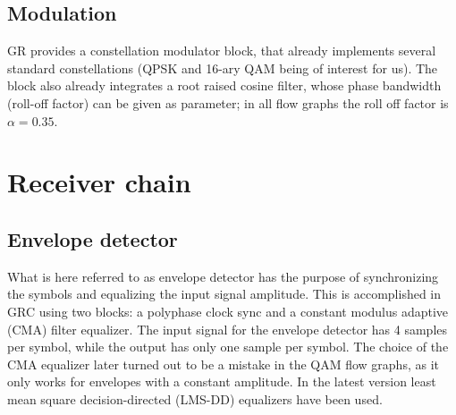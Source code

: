 \subsection{Modulation}

GR provides a constellation modulator block, that already implements several standard constellations (QPSK and 16-ary QAM being of interest for us). The block also already integrates a root raised cosine filter, whose phase bandwidth (roll-off factor) can be given as parameter; in all flow graphs the roll off factor is \(\alpha = 0.35\).

%

\section{Receiver chain}

\subsection{Envelope detector}

What is here referred to as envelope detector has the purpose of synchronizing the symbols and equalizing the input signal amplitude. This is accomplished in GRC using two blocks: a polyphase clock sync and a constant modulus adaptive (CMA) filter equalizer. The input signal for the envelope detector has 4 samples per symbol, while the output has only one sample per symbol. The choice of the CMA equalizer later turned out to be a mistake in the QAM flow graphs, as it only works for envelopes with a constant amplitude. In the latest version least mean square decision-directed (LMS-DD) equalizers have been used.

